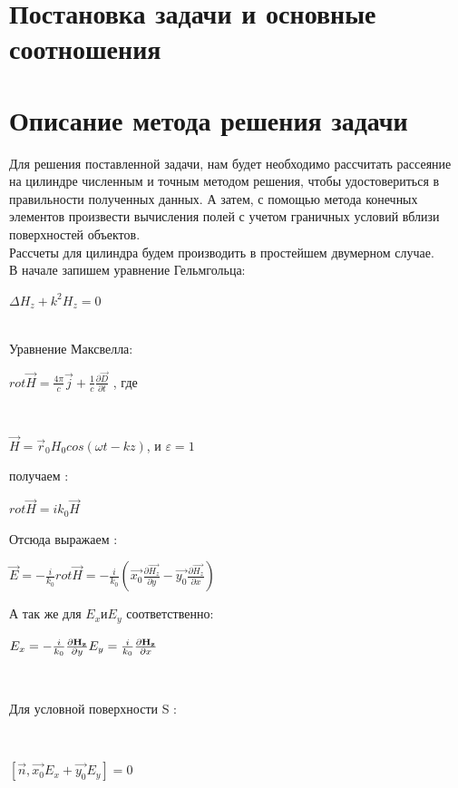 \section{Постановка задачи и основные соотношения}

\section{Описание метода решения задачи}
Для решения поставленной задачи, нам будет необходимо рассчитать рассеяние на цилиндре численным и точным методом решения, чтобы удостовериться в правильности полученных данных. А затем, с помощью метода конечных элементов произвести вычисления полей с учетом граничных условий вблизи поверхностей объектов.
\\ 
Рассчеты для цилиндра будем производить в простейшем двумерном случае.
\\
В начале запишем уравнение Гельмгольца: \\
\begin{center}
	$ ΔH_{z} + k^2H_{z} = 0 $ 
\end{center}\\
Уравнение Максвелла: \\
\begin{center}
	$ rot\vec{H} =\frac{4\pi}{c}\vec{j} + \frac{1}{c}\frac{\partial \vec{D}}{\partial t} $ , где
\end{center}\\
\begin{center}
	$ \vec{H} = \vec{r}_{0}H_{0}cos(\omega t - kz) $, и $ \varepsilon = 1 $ \\
\end{center}
получаем : \begin{center}
	$ rot\vec{H} = ik_{0}\vec{H} $
\end{center}
Отсюда выражаем  : \\
\begin{center}
	$\vec{E} = - \frac{i}{k_{0}} rot\vec{H} = - \frac{i}{k_{0}}(\vec{x_{0}}\frac{\partial \vec{H_{z}}}{\partial y} - \vec{y_{0}}\frac{\partial \vec{H_{z}}}{\partial x}) 
	$
\end{center}

\begin{flushleft}
	А так же для $ E_{x} и E_{y} $ соответственно: \\
\end{flushleft}
\begin{center}
	$ E_{x} = - 
	\frac{i}{k_{0}}
	\frac{\partial\vec{H_{z}}}{\partial y} \\
	E_{y} = \frac{i}{k_{0}}
	\frac{\partial\vec{H_{z}}}{\partial x} \\ $
\end{center} \\
\begin{flushleft}
	Для условной поверхности S :
\end{flushleft} \\
\begin{center}
	$ [\vec{n}, \vec{x_{0}}E_{x} + \vec{y_{0}}E_{y}] = 0 $
\end{center}\\

